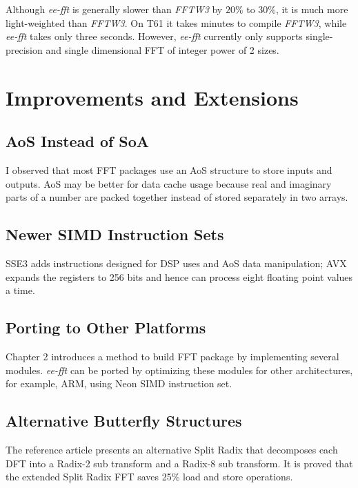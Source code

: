 \documentclass[a4paper]{report}
\begin{document}
	Although \textit{ee-fft} is generally slower than \textit{FFTW3} by $20\%$ to $30\%$, it is much more light-weighted than \textit{FFTW3}. On T61 it takes minutes to compile \textit{FFTW3}, while \textit{ee-fft} takes only three seconds. However, \textit{ee-fft} currently only supports single-precision and single dimensional FFT of integer power of 2 sizes.

\section{Improvements and Extensions} \indent

\subsection{AoS Instead of SoA} \indent

	I observed that most FFT packages use an AoS structure to store inputs and outputs. AoS may be better for data cache usage because real and imaginary parts of a number are packed together instead of stored separately in two arrays.

\subsection{Newer SIMD Instruction Sets} \indent

	SSE3 adds instructions designed for DSP uses and AoS data manipulation; AVX expands the registers to 256 bits and hence can process eight floating point values a time.

\subsection{Porting to Other Platforms} \indent

	Chapter 2 introduces a method to build FFT package by implementing several modules. \textit{ee-fft} can be ported by optimizing these modules for other architectures, for example, ARM, using Neon SIMD instruction set.

\subsection{Alternative Butterfly Structures} \indent

	The reference article\cite{extsplit} presents an alternative Split Radix that decomposes each DFT into a Radix-2 sub transform and a Radix-8 sub transform. It is proved that the extended Split Radix FFT saves 25\% load and store operations.
\end{document}
